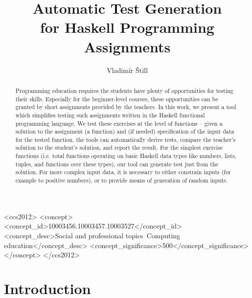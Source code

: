 \documentclass[sigconf,screen]{acmart} %
\begin{document}
\title{Automatic Test Generation\\ for Haskell Programming Assignments}

\author{Vladimír Štill}

\begin{abstract}
    Programming education requires the students have plenty of opportunities
    for testing their skills.
    Especially for the beginner-level courses, these opportunities can be
    granted by short assignments provided by the teachers.
    In this work, we present a tool which simplifies testing such assignments
    written in the Haskell functional programming language.
    We test these exercises at the level of functions -- given a solution to
    the assignment (a function) and (if needed) specification of the input data
    for the tested function, the tools can automatically derive tests, compare
    the teacher's solution to the student's solution, and report the result.
    For the simplest exercise functions (i.e. total functions operating on
    basic Haskell data types like numbers, lists, tuples, and functions over
    these types), our tool can generate test just from the solution.
    For more complex input data, it is necessary to either constrain inputs
    (for example to positive numbers), or to provide means of generation of
    random inputs.
\end{abstract}

\begin{CCSXML}
<ccs2012>
    <concept>
        <concept_id>10003456.10003457.10003527</concept_id>
        <concept_desc>Social and professional topics~Computing education</concept_desc>
        <concept_significance>500</concept_significance>
    </concept>
</ccs2012>
\end{CCSXML}



\maketitle

\section{Introduction}
\end{document}
